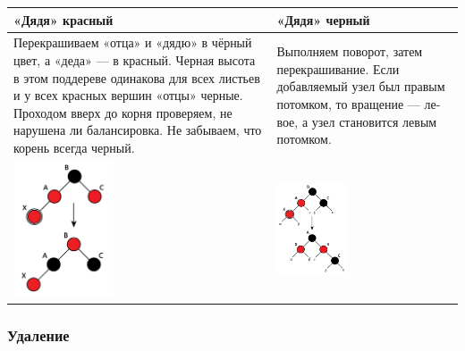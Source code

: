 \begin{center}
\begin{tabular}{|m{8cm}|m{8cm}|}
\hline
«Дядя» красный & «Дядя» черный \\ \hline
Перекрашиваем «отца» и «дядю» в чёрный цвет, а «деда» --- в красный.
Черная высота в этом поддереве одинакова для всех листьев и у всех красных вершин «отцы» черные.
Проходом вверх до корня проверяем, не нарушена ли балансировка.
Не забываем, что корень всегда черный. &
Выполняем поворот, затем перекрашивание.
Если добавляемый узел был правым потомком, то вращение --- ле-
вое, а узел становится левым потомком. \\ \hline

\includegraphics[width=0.4\textwidth]{img/3_1.png} 
&
\includegraphics[width=0.4\textwidth]{img/3_2.png} \\ \hline

\end{tabular}
\end{center}

\subsubsection{Удаление}

